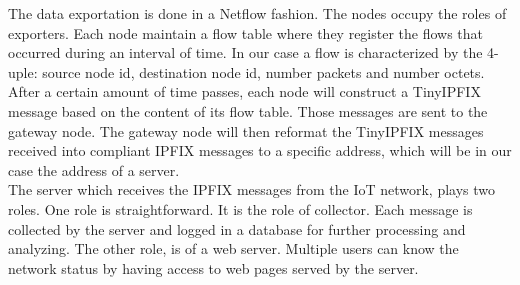 The data exportation is done in a Netflow fashion. The nodes occupy the roles of exporters. Each node maintain a flow table where they register the flows that occurred during an interval of time. In our case a flow is characterized by the 4-uple: source node id, destination node id, number packets and number octets. After a certain amount of time passes, each node will construct a TinyIPFIX message based on the content of its flow table. Those messages are sent to the gateway node. The gateway node will then reformat the TinyIPFIX messages received into compliant IPFIX messages to a specific address, which will be in our case the address of a server.\\

The server which receives the IPFIX messages from the IoT network, plays two roles. One role is straightforward. It is the role of collector. Each message is collected by the server and logged in a database for further processing and analyzing. The other role, is of a web server. Multiple users can know the network status by having access to web pages served by the server.

